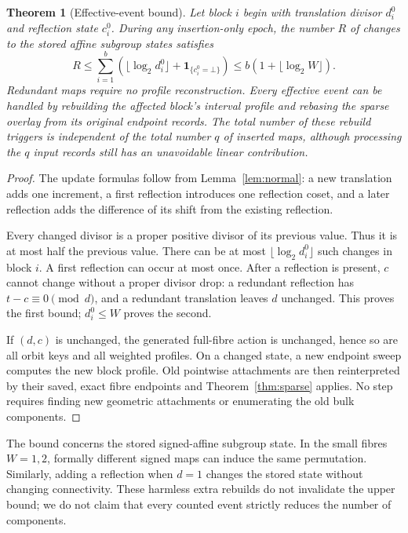 \documentclass[11pt]{article}
\newtheorem{theorem}{Theorem}[section]
\theoremstyle{definition}
\newcommand{\ind}{\mathbf 1}
\begin{document}
\begin{theorem}[Effective-event bound]
\label{thm:epoch}
Let block $i$ begin with translation divisor $d_i^0$ and reflection state $c_i^0$. During any insertion-only epoch, the number $R$ of changes to the stored affine subgroup states satisfies
\begin{equation}
 R\le\sum_{i=1}^b\left(\lfloor\log_2 d_i^0\rfloor+
              \ind_{\{c_i^0=\bot\}}\right)
 \le b(1+\lfloor\log_2W\rfloor).
 \label{eq:eventbound}
\end{equation}
Redundant maps require no profile reconstruction. Every effective event can be handled by rebuilding the affected block's interval profile and rebasing the sparse overlay from its original endpoint records. The total number of these rebuild triggers is independent of the total number $q$ of inserted maps, although processing the $q$ input records still has an unavoidable linear contribution.
\end{theorem}
\begin{proof}
The update formulas follow from Lemma~\ref{lem:normal}: a new translation adds one increment, a first reflection introduces one reflection coset, and a later reflection adds the difference of its shift from the existing reflection.

Every changed divisor is a proper positive divisor of its previous value. Thus it is at most half the previous value. There can be at most $\lfloor\log_2d_i^0\rfloor$ such changes in block $i$. A first reflection can occur at most once. After a reflection is present, $c$ cannot change without a proper divisor drop: a redundant reflection has $t-c\equiv0\pmod d$, and a redundant translation leaves $d$ unchanged. This proves the first bound; $d_i^0\le W$ proves the second.

If $(d,c)$ is unchanged, the generated full-fibre action is unchanged, hence so are all orbit keys and all weighted profiles. On a changed state, a new endpoint sweep computes the new block profile. Old pointwise attachments are then reinterpreted by their saved, exact fibre endpoints and Theorem~\ref{thm:sparse} applies. No step requires finding new geometric attachments or enumerating the old bulk components.
\end{proof}

The bound concerns the stored signed-affine subgroup state. In the small fibres $W=1,2$, formally different signed maps can induce the same permutation. Similarly, adding a reflection when $d=1$ changes the stored state without changing connectivity. These harmless extra rebuilds do not invalidate the upper bound; we do not claim that every counted event strictly reduces the number of components.
\end{document}
